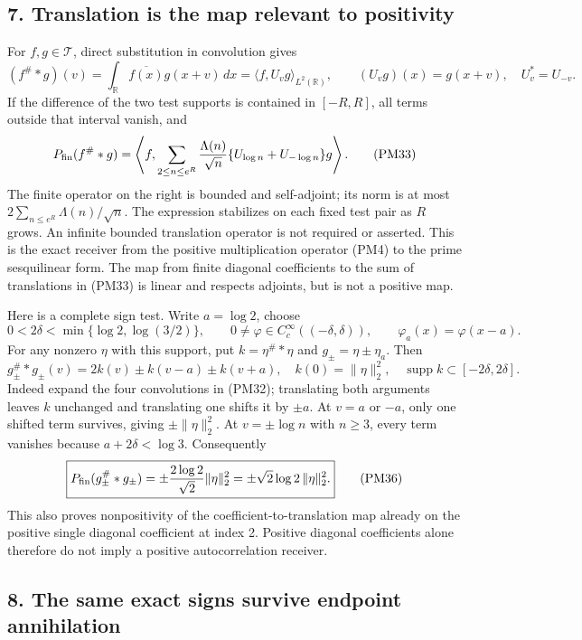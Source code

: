 \documentclass[
  10pt,
  a4paper,
]{article}
\begin{document}
\subsection{7. Translation is the map relevant to
positivity}\label{translation-is-the-map-relevant-to-positivity}

For \(f,g\in\mathcal T\), direct substitution in convolution gives \[
(f^\#*g)(v)=\int_{\mathbb R}\overline{f(x)}g(x+v)\,dx
=\langle f,U_vg\rangle_{L^2(\mathbb R)},\qquad
(U_vg)(x)=g(x+v),\quad U_v^*=U_{-v}.
\tag{PM32}
\] If the difference of the two test supports is contained in
\([-R,R]\), all terms outside that interval vanish, and \[
P_{\rm fin}(f^\#*g)
=\left\langle f,
\sum_{2\le n\le e^R}\frac{\Lambda(n)}{\sqrt n}
\{U_{\log n}+U_{-\log n}\}g\right\rangle.
\tag{PM33}
\] The finite operator on the right is bounded and self-adjoint; its
norm is at most \(2\sum_{n\le e^R}\Lambda(n)/\sqrt n\). The expression
stabilizes on each fixed test pair as \(R\) grows. An infinite bounded
translation operator is not required or asserted. This is the exact
receiver from the positive multiplication operator (PM4) to the prime
sesquilinear form. The map from finite diagonal coefficients to the sum
of translations in (PM33) is linear and respects adjoints, but is not a
positive map.

Here is a complete sign test. Write \(a=\log2\), choose \[
0<2\delta<\min\{\log2,\log(3/2)\},\qquad
0\ne\varphi\in C_c^\infty((-\delta,\delta)),\qquad
\varphi_a(x)=\varphi(x-a).
\tag{PM34}
\] For any nonzero \(\eta\) with this support, put \(k=\eta^\#*\eta\)
and \(g_\pm=\eta\pm\eta_a\). Then \[
g_\pm^\#*g_\pm(v)=2k(v)\pm k(v-a)\pm k(v+a),
\quad k(0)=\|\eta\|_2^2,
\quad\operatorname{supp}k\subset[-2\delta,2\delta].
\tag{PM35}
\] Indeed expand the four convolutions in (PM32); translating both
arguments leaves \(k\) unchanged and translating one shifts it by
\(\pm a\). At \(v=a\) or \(-a\), only one shifted term survives, giving
\(\pm\|\eta\|_2^2\). At \(v=\pm\log n\) with \(n\ge3\), every term
vanishes because \(a+2\delta<\log3\). Consequently \[
\boxed{P_{\rm fin}(g_\pm^\#*g_\pm)
=\pm\frac{2\log2}{\sqrt2}\|\eta\|_2^2
=\pm\sqrt2\log2\,\|\eta\|_2^2.}
\tag{PM36}
\] This also proves nonpositivity of the coefficient-to-translation map
already on the positive single diagonal coefficient at index 2. Positive
diagonal coefficients alone therefore do not imply a positive
autocorrelation receiver.

\subsection{8. The same exact signs survive endpoint
annihilation}\label{the-same-exact-signs-survive-endpoint-annihilation}
\end{document}
